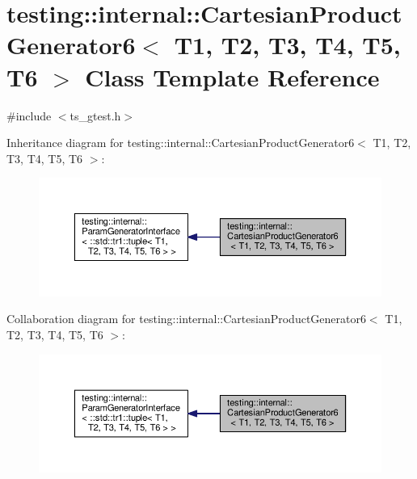 \hypertarget{classtesting_1_1internal_1_1CartesianProductGenerator6}{\section{testing\-:\-:internal\-:\-:Cartesian\-Product\-Generator6$<$ T1, T2, T3, T4, T5, T6 $>$ Class Template Reference}
\label{classtesting_1_1internal_1_1CartesianProductGenerator6}
}


{\ttfamily \#include $<$ts\-\_\-gtest.\-h$>$}



Inheritance diagram for testing\-:\-:internal\-:\-:Cartesian\-Product\-Generator6$<$ T1, T2, T3, T4, T5, T6 $>$\-:\nopagebreak
\begin{figure}[H]
\begin{center}
\leavevmode
\includegraphics[width=350pt]{classtesting_1_1internal_1_1CartesianProductGenerator6__inherit__graph}
\end{center}
\end{figure}


Collaboration diagram for testing\-:\-:internal\-:\-:Cartesian\-Product\-Generator6$<$ T1, T2, T3, T4, T5, T6 $>$\-:\nopagebreak
\begin{figure}[H]
\begin{center}
\leavevmode
\includegraphics[width=350pt]{classtesting_1_1internal_1_1CartesianProductGenerator6__coll__graph}
\end{center}
\end{figure}
